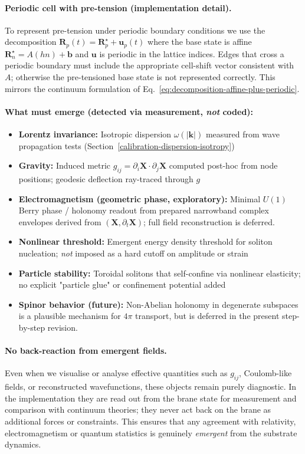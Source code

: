 \paragraph{Periodic cell with pre-tension (implementation detail).}
To represent pre-tension under periodic boundary conditions we use the decomposition
$\mathbf R_p(t)=\mathbf R^\star_p+\mathbf u_p(t)$ where the base state is affine
$\mathbf R^\star_{n}=A(hn)+\mathbf b$ and $\mathbf u$ is periodic in the lattice indices.
Edges that cross a periodic boundary must include the appropriate cell-shift vector
consistent with $A$; otherwise the pre-tensioned base state is not represented correctly.
This mirrors the continuum formulation of Eq.~\eqref{eq:decomposition-affine-plus-periodic}.

\paragraph{What must emerge (detected via measurement, \emph{not} coded):}
\begin{itemize}
\item \textbf{Lorentz invariance:} Isotropic dispersion $\omega(|\mathbf{k}|)$ measured from wave propagation tests (Section~\ref{calibration-dispersion-isotropy})
\item \textbf{Gravity:} Induced metric $g_{ij} = \partial_i \mathbf{X} \cdot \partial_j \mathbf{X}$ computed post-hoc from node positions; geodesic deflection ray-traced through $g$
\item \textbf{Electromagnetism (geometric phase, exploratory):} Minimal $U(1)$ Berry phase / holonomy readout from prepared narrowband complex envelopes derived from $(\mathbf X,\partial_t\mathbf X)$; full field reconstruction is deferred.
\item \textbf{Nonlinear threshold:} Emergent energy density threshold for soliton nucleation; \emph{not} imposed as a hard cutoff on amplitude or strain
\item \textbf{Particle stability:} Toroidal solitons that self-confine via nonlinear elasticity; no explicit "particle glue" or confinement potential added
\item \textbf{Spinor behavior (future):} Non-Abelian holonomy in degenerate subspaces is a plausible mechanism for $4\pi$ transport, but is deferred in the present step-by-step revision.
\end{itemize}

\paragraph{No back-reaction from emergent fields.}
Even when we visualise or analyse effective quantities such as $g_{ij}$,
Coulomb-like fields, or reconstructed wavefunctions, these objects remain purely
diagnostic. In the implementation they are read out from the brane state for
measurement and comparison with continuum theories; they never act back on the
brane as additional forces or constraints. This ensures that any agreement with
relativity, electromagnetism or quantum statistics is genuinely \emph{emergent}
from the substrate dynamics.

